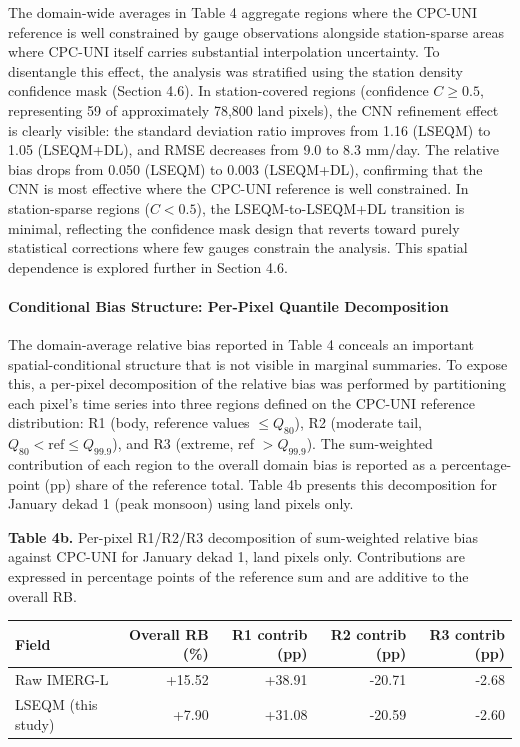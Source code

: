\documentclass[11pt,a4paper]{article}
\begin{document}
The domain-wide averages in Table 4 aggregate regions where the CPC-UNI
reference is well constrained by gauge observations alongside
station-sparse areas where CPC-UNI itself carries substantial
interpolation uncertainty. To disentangle this effect, the analysis was
stratified using the station density confidence mask (Section 4.6). In
station-covered regions (confidence \(C \geq 0.5\), representing 59 of
approximately 78,800 land pixels), the CNN refinement effect is clearly
visible: the standard deviation ratio improves from 1.16 (LSEQM) to 1.05
(LSEQM+DL), and RMSE decreases from 9.0 to 8.3 mm/day. The relative bias
drops from 0.050 (LSEQM) to 0.003 (LSEQM+DL), confirming that the CNN is
most effective where the CPC-UNI reference is well constrained. In
station-sparse regions (\(C < 0.5\)), the LSEQM-to-LSEQM+DL transition
is minimal, reflecting the confidence mask design that reverts toward
purely statistical corrections where few gauges constrain the analysis.
This spatial dependence is explored further in Section 4.6.

\paragraph{Conditional Bias Structure: Per-Pixel Quantile
Decomposition}

The domain-average relative bias reported in Table 4 conceals an
important spatial-conditional structure that is not visible in marginal
summaries. To expose this, a per-pixel decomposition of the relative
bias was performed by partitioning each pixel's time series into three
regions defined on the CPC-UNI reference distribution: R1 (body,
reference values \(\leq Q_{80}\)), R2 (moderate tail,
\(Q_{80} < \text{ref} \leq Q_{99.9}\)), and R3 (extreme, ref
\(> Q_{99.9}\)). The sum-weighted contribution of each region to the
overall domain bias is reported as a percentage-point (pp) share of the
reference total. Table 4b presents this decomposition for January dekad
1 (peak monsoon) using land pixels only.

\textbf{Table 4b.} Per-pixel R1/R2/R3 decomposition of sum-weighted
relative bias against CPC-UNI for January dekad 1, land pixels only.
Contributions are expressed in percentage points of the reference sum
and are additive to the overall RB.

\begingroup\small
\begin{longtable}[]{@{}lrrrr@{}}
\toprule
Field & Overall RB (\%) & R1 contrib (pp) & R2 contrib (pp) & R3 contrib (pp) \\
\midrule
\endhead
\bottomrule
\endlastfoot
Raw IMERG-L & +15.52 & +38.91 & -20.71 & -2.68 \\
LSEQM (this study) & +7.90 & +31.08 & -20.59 & -2.60 \\
\end{longtable}
\endgroup
\end{document}
